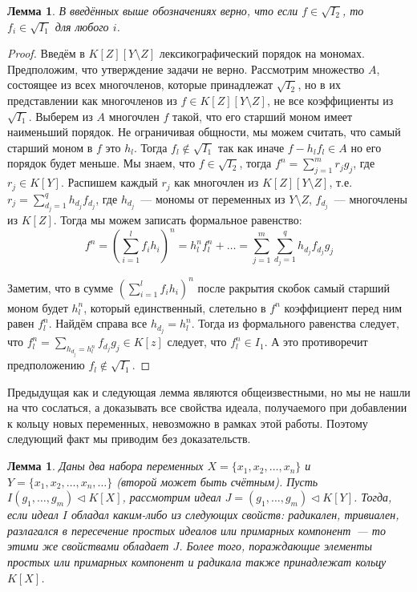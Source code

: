 \documentclass[16pt]{article}
\theoremstyle{plain1}
\newtheorem{lemma}[theorem1]{Лемма}
\theoremstyle{plain2}
\theoremstyle{plain}
\theoremstyle{plain3}
\theoremstyle{definition}
\theoremstyle{remark}
\begin{document}
\begin{lemma}\label{lemma:extention ring}
В введённых выше обозначениях верно, что  если $f\in \sqrt{I_2}$, то $f_i\in \sqrt{I_1}$ для любого $i$. 
\end{lemma}
\begin{proof}
Введём в $K[Z][Y\setminus Z]$ лексикографический порядок на мономах. Предположим, что утверждение задачи не верно. Рассмотрим множество $A$, состоящее из всех многочленов, которые принадлежат $\sqrt{I_2}$, но в их представлении как многочленов из $f\in K[Z][Y\setminus Z]$, не все коэффициенты из $ \sqrt{I_1}$.   Выберем из $A$ многочлен $f$ такой, что его старший моном имеет наименьший порядок. Не ограничивая общности, мы можем считать, что самый старший моном в $f$ это $h_l$. Тогда $f_l\not\in\sqrt{I_1}$ так как иначе $f-h_lf_l\in A$ но его порядок будет меньше. Мы знаем, что  $f\in \sqrt{I_2}$, тогда $f^n=\sum\limits_{j=1}^mr_jg_j$, где $r_j\in K[Y]$. Распишем каждый $r_j$ как многочлен из $K[Z][Y\setminus Z]$, т.е.  $r_j=\sum\limits_{d_j=1}^{q}h_{d_j}f_{d_j}$,  где $h_{d_j}$~--- мономы от переменных из $Y\setminus Z$, $f_{d_j}$~--- многочлены из $K[Z]$. Тогда мы можем записать формальное равенство: 
$$
f^n=(\sum\limits_{i=1}^lf_ih_i)^n=h_l^nf_l^n+\ldots=\sum\limits_{j=1}^m\sum\limits_{d_j=1}^{q}h_{d_j}f_{d_j}g_j
$$

Заметим, что в сумме $(\sum\limits_{i=1}^lf_ih_i)^n$ после ракрытия скобок самый старший моном будет $h_l^n$, который единственный, слетельно в $f^n$  коэффициент перед ним равен $f_l^n$. Найдём справа все $h_{d_j}= h_l^n$. Тогда из формального равенства следует, что $f_l^n=\sum\limits_{h_{d_j}= h_l^n}f_{d_j}g_j\in K[z]$ следует, что $f_l^n\in I_1$. А это противоречит предположению $f_l\not\in\sqrt{I_1}$.
\end{proof}


Предыдущая как и следующая лемма являются общеизвестными, но мы не нашли на что сослаться, а доказывать все свойства идеала, получаемого при добавлении к кольцу новых переменных, невозможно в рамках этой работы. Поэтому следующий факт мы приводим без доказательств.

\begin{lemma}\label{lemma:extention ring2}
Даны два набора переменных $X=\{x_1,x_2,\ldots,x_n\}$ и $Y=\{x_1,x_2,\ldots,x_n,\ldots\}$ (второй может быть счётным). Пусть $I(g_1,\ldots, g_m)\triangleleft K[X]$, рассмотрим идеал $J=(g_1,\ldots, g_m)\triangleleft K[Y]$. Тогда, если идеал $I$ обладал каким-либо из следующих свойств: радикален, тривиален, разлагался в пересечение простых идеалов или примарных компонент~--- то этими же свойствами обладает $J$. Более того, пораждающие элементы простых или примарных компонент и радикала также принадлежат кольцу $ K[X]$. 
\end{lemma}
\end{document}
